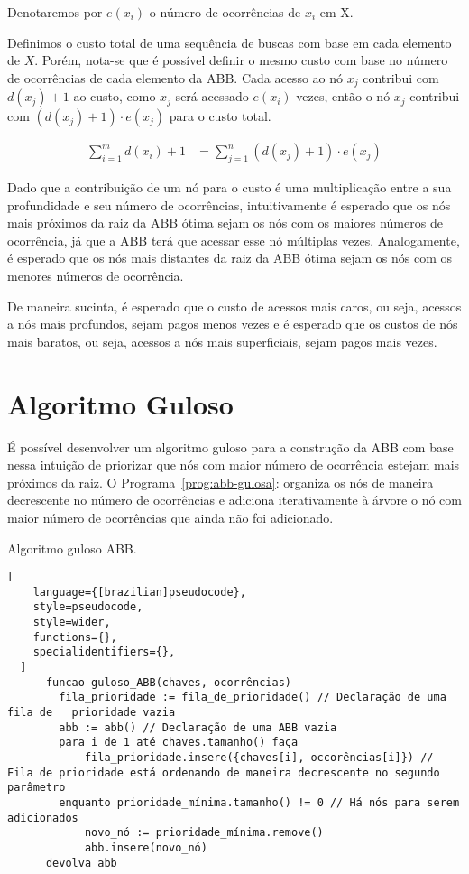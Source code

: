 Denotaremos por $e(x_i)$ o número de ocorrências de $x_i$ em X.

Definimos o custo total de uma sequência de buscas com base em cada elemento de $X$. Porém, nota-se que é possível definir o mesmo custo com base no número de ocorrências de cada elemento da ABB. Cada acesso ao nó $x_j$ contribui com $d(x_j) + 1$ ao custo, como $x_j$ será acessado $e(x_i)$ vezes, então o nó $x_j$ contribui com $(d(x_j) + 1)  \cdot e(x_j)$ para o custo total.

\begin{align*}
\sum_{i=1}^{m} d(x_i) + 1 &= \sum_{j=1}^{n} (d(x_j) + 1) \cdot e(x_j)
\end{align*}


Dado que a contribuição de um nó para o custo é uma multiplicação entre a sua profundidade e seu número de ocorrências, intuitivamente é esperado que os nós mais próximos da raiz da ABB ótima sejam os nós com os maiores números de ocorrência, já que a ABB terá que acessar esse nó múltiplas vezes. Analogamente, é esperado que os nós mais distantes da raiz da ABB ótima sejam os nós com os menores números de ocorrência.

De maneira sucinta, é esperado que o custo de acessos mais caros, ou seja, acessos a nós mais profundos, sejam pagos menos vezes e é esperado que os custos de nós mais baratos, ou seja, acessos a nós mais superficiais, sejam pagos mais vezes.

\section{Algoritmo Guloso}

É possível desenvolver um algoritmo guloso para a construção da ABB com base nessa intuição de priorizar que nós com maior número de ocorrência estejam mais próximos da raiz. O Programa~\ref{prog:abb-gulosa}: organiza os nós de maneira decrescente no número de ocorrências e adiciona iterativamente à árvore o nó com maior número de ocorrências que ainda não foi adicionado.

\begin{programruledcaption}{Algoritmo guloso ABB.\label{prog:abb-gulosa}}
  \begin{lstlisting}[
    language={[brazilian]pseudocode},
    style=pseudocode,
    style=wider,
    functions={},
    specialidentifiers={},
  ]
      funcao guloso_ABB(chaves, ocorrências)
        fila_prioridade := fila_de_prioridade() // Declaração de uma fila de   prioridade vazia
        abb := abb() // Declaração de uma ABB vazia
        para i de 1 até chaves.tamanho() faça
            fila_prioridade.insere({chaves[i], occorências[i]}) // Fila de prioridade está ordenando de maneira decrescente no segundo parâmetro
        enquanto prioridade_mínima.tamanho() != 0 // Há nós para serem adicionados
            novo_nó := prioridade_mínima.remove()
            abb.insere(novo_nó)
	  devolva abb
  \end{lstlisting}
\end{programruledcaption}


